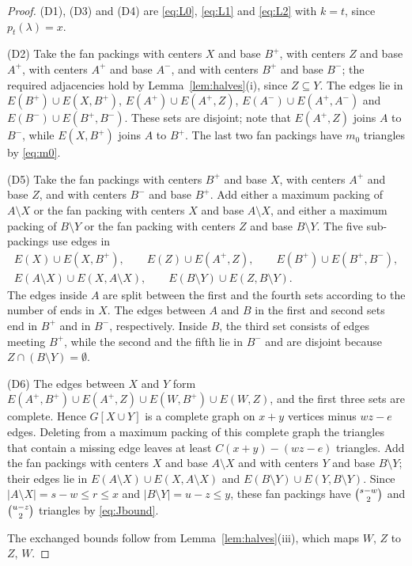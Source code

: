 \documentclass{amsart}
\theoremstyle{definition}
\numberwithin{equation}{section}
\numberwithin{table}{section}
\newcommand{\binomtwo}[1]{\tbinom{#1}{2}}
\begin{document}
\begin{proof}
(D1), (D3) and (D4) are \eqref{eq:L0}, \eqref{eq:L1} and \eqref{eq:L2} with $k=t$, since $p_t(\lambda)=x$.

(D2) Take the fan packings with centers $X$ and base $B^+$, with centers $Z$ and base $A^+$, with centers $A^+$ and base $A^-$, and with centers $B^+$ and base $B^-$; the required adjacencies hold by Lemma~\ref{lem:halves}(i), since $Z\subseteq Y$. The edges lie in $E(B^+)\cup E(X,B^+)$, $E(A^+)\cup E(A^+,Z)$, $E(A^-)\cup E(A^+,A^-)$ and $E(B^-)\cup E(B^+,B^-)$. These sets are disjoint; note that $E(A^+,Z)$ joins $A$ to $B^-$, while $E(X,B^+)$ joins $A$ to $B^+$. The last two fan packings have $m_0$ triangles by \eqref{eq:m0}.

(D5) Take the fan packings with centers $B^+$ and base $X$, with centers $A^+$ and base $Z$, and with centers $B^-$ and base $B^+$. Add either a maximum packing of $A\setminus X$ or the fan packing with centers $X$ and base $A\setminus X$, and either a maximum packing of $B\setminus Y$ or the fan packing with centers $Z$ and base $B\setminus Y$. The five sub-packings use edges in
\begin{gather*}
E(X)\cup E(X,B^+),\qquad E(Z)\cup E(A^+,Z),\qquad E(B^+)\cup E(B^+,B^-),\\
E(A\setminus X)\cup E(X,A\setminus X),\qquad E(B\setminus Y)\cup E(Z,B\setminus Y).
\end{gather*}
The edges inside $A$ are split between the first and the fourth sets according to the number of ends in $X$. The edges between $A$ and $B$ in the first and second sets end in $B^+$ and in $B^-$, respectively. Inside $B$, the third set consists of edges meeting $B^+$, while the second and the fifth lie in $B^-$ and are disjoint because $Z\cap(B\setminus Y)=\emptyset$.

(D6) The edges between $X$ and $Y$ form $E(A^+,B^+)\cup E(A^+,Z)\cup E(W,B^+)\cup E(W,Z)$, and the first three sets are complete. Hence $G[X\cup Y]$ is a complete graph on $x+y$ vertices minus $wz-e$ edges. Deleting from a maximum packing of this complete graph the triangles that contain a missing edge leaves at least $C(x+y)-(wz-e)$ triangles. Add the fan packings with centers $X$ and base $A\setminus X$ and with centers $Y$ and base $B\setminus Y$; their edges lie in $E(A\setminus X)\cup E(X,A\setminus X)$ and $E(B\setminus Y)\cup E(Y,B\setminus Y)$. Since $|A\setminus X|=s-w\le r\le x$ and $|B\setminus Y|=u-z\le y$, these fan packings have $\binomtwo{s-w}$ and $\binomtwo{u-z}$ triangles by \eqref{eq:Jbound}.

The exchanged bounds follow from Lemma~\ref{lem:halves}(iii), which maps $W$, $Z$ to $Z$, $W$.
\end{proof}
\end{document}
